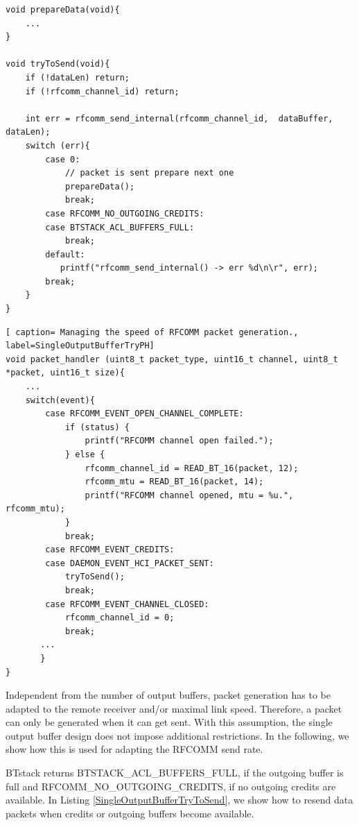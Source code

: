 \noindent\begin{minipage}{\textwidth}
\begin{lstlisting}[caption=Preparing and sending data., label=SingleOutputBufferTryToSend]
void prepareData(void){
    ...
}

void tryToSend(void){
    if (!dataLen) return;
    if (!rfcomm_channel_id) return;
    
    int err = rfcomm_send_internal(rfcomm_channel_id,  dataBuffer, dataLen);
    switch (err){
        case 0:
            // packet is sent prepare next one
            prepareData();
            break;
        case RFCOMM_NO_OUTGOING_CREDITS:
        case BTSTACK_ACL_BUFFERS_FULL:
            break;
        default:
           printf("rfcomm_send_internal() -> err %d\n\r", err);
        break;
    }
}
\end{lstlisting}
\begin{lstlisting}[ caption= Managing the speed of RFCOMM packet generation., label=SingleOutputBufferTryPH]
void packet_handler (uint8_t packet_type, uint16_t channel, uint8_t *packet, uint16_t size){
    ...
    switch(event){
        case RFCOMM_EVENT_OPEN_CHANNEL_COMPLETE:
            if (status) {
                printf("RFCOMM channel open failed.");
            } else {
                rfcomm_channel_id = READ_BT_16(packet, 12);
                rfcomm_mtu = READ_BT_16(packet, 14);
                printf("RFCOMM channel opened, mtu = %u.", rfcomm_mtu);
            }
            break;
        case RFCOMM_EVENT_CREDITS:
        case DAEMON_EVENT_HCI_PACKET_SENT:
            tryToSend();
            break;
        case RFCOMM_EVENT_CHANNEL_CLOSED:
            rfcomm_channel_id = 0;
            break;
       ...
       }
}
\end{lstlisting}
\end{minipage}

Independent from the number of output buffers, packet generation has to be adapted to the remote receiver and/or maximal link speed. Therefore, a packet can only be generated when it can get sent. With this assumption, the single output buffer design does not impose additional restrictions. In the following, we show how this is used for adapting the RFCOMM send rate. 

BTstack returns BTSTACK\_ACL\_BUFFERS\_FULL, if the outgoing buffer is full and RFCOMM\_NO\_OUTGOING\_CREDITS, if no outgoing credits are available. In Listing \ref{SingleOutputBufferTryToSend}, we show how to resend data packets when credits or outgoing buffers become available.


